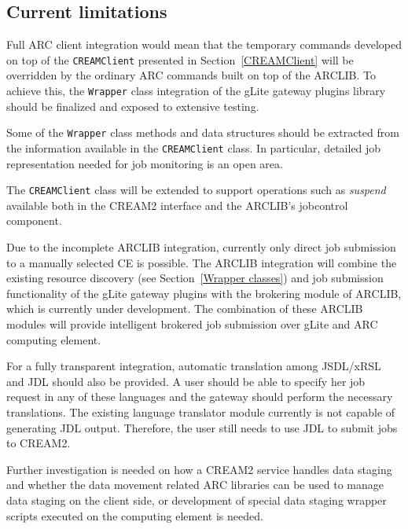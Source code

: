 \documentclass{article}
\begin{document}
\subsection{Current limitations}
\label{Current limitations}
Full ARC client integration would mean that the temporary commands developed on top of the \texttt{CREAMClient} presented in Section~\ref{CREAMClient} will be overridden by the ordinary ARC commands built on top of the ARCLIB. To achieve this, the \texttt{Wrapper} class integration of the gLite gateway plugins library should be finalized and exposed to extensive testing.

Some of the \texttt{Wrapper} class methods and data structures should be extracted from the information available in the \texttt{CREAMClient} class. In particular, detailed job representation needed for job monitoring is an open area.

The \texttt{CREAMClient} class will be extended to support operations such as \textit{suspend} available both in the CREAM2 interface and the ARCLIB's jobcontrol component.

Due to the incomplete ARCLIB integration, currently only direct job submission to a manually selected CE is possible. The ARCLIB integration will combine the existing resource discovery (see Section~\ref{Wrapper classes}) and job submission functionality of the gLite gateway plugins with the brokering module of ARCLIB, which is currently under development. The combination of these ARCLIB modules will provide intelligent brokered job submission over gLite and ARC computing element.

For a fully transparent integration, automatic translation among JSDL/xRSL and JDL should also be provided. A user should be able to specify her job request in any of these languages and the gateway should perform the necessary translations.  The existing language translator module currently is not capable of generating JDL output. Therefore, the user still needs to use JDL to submit jobs to CREAM2.

Further investigation is needed on how a CREAM2 service handles data staging and whether the data movement related ARC libraries can be used to manage data staging on the client side, or development of special data staging wrapper scripts executed on the computing element is needed.
\end{document}
